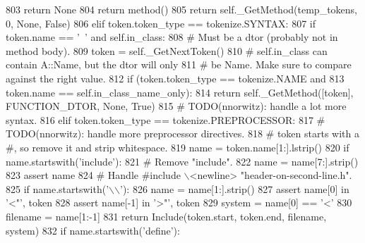 \begin{DoxyCode}
803                     \textcolor{keywordflow}{return} \textcolor{keywordtype}{None}
804                 \textcolor{keywordflow}{return} method()
805             \textcolor{keywordflow}{return} self.\_GetMethod(temp\_tokens, 0, \textcolor{keywordtype}{None}, \textcolor{keyword}{False})
806         \textcolor{keywordflow}{elif} token.token\_type == tokenize.SYNTAX:
807             \textcolor{keywordflow}{if} token.name == \textcolor{stringliteral}{'~'} \textcolor{keywordflow}{and} self.in\_class:
808                 \textcolor{comment}{# Must be a dtor (probably not in method body).}
809                 token = self.\_GetNextToken()
810                 \textcolor{comment}{# self.in\_class can contain A::Name, but the dtor will only}
811                 \textcolor{comment}{# be Name.  Make sure to compare against the right value.}
812                 \textcolor{keywordflow}{if} (token.token\_type == tokenize.NAME \textcolor{keywordflow}{and}
813                     token.name == self.in\_class\_name\_only):
814                     \textcolor{keywordflow}{return} self.\_GetMethod([token], FUNCTION\_DTOR, \textcolor{keywordtype}{None}, \textcolor{keyword}{True})
815             \textcolor{comment}{# TODO(nnorwitz): handle a lot more syntax.}
816         \textcolor{keywordflow}{elif} token.token\_type == tokenize.PREPROCESSOR:
817             \textcolor{comment}{# TODO(nnorwitz): handle more preprocessor directives.}
818             \textcolor{comment}{# token starts with a #, so remove it and strip whitespace.}
819             name = token.name[1:].lstrip()
820             \textcolor{keywordflow}{if} name.startswith(\textcolor{stringliteral}{'include'}):
821                 \textcolor{comment}{# Remove "include".}
822                 name = name[7:].strip()
823                 \textcolor{keyword}{assert} name
824                 \textcolor{comment}{# Handle #include \(\backslash\)<newline> "header-on-second-line.h".}
825                 \textcolor{keywordflow}{if} name.startswith(\textcolor{stringliteral}{'\(\backslash\)\(\backslash\)'}):
826                     name = name[1:].strip()
827                 \textcolor{keyword}{assert} name[0] \textcolor{keywordflow}{in} \textcolor{stringliteral}{'<"'}, token
828                 \textcolor{keyword}{assert} name[-1] \textcolor{keywordflow}{in} \textcolor{stringliteral}{'>"'}, token
829                 system = name[0] == \textcolor{stringliteral}{'<'}
830                 filename = name[1:-1]
831                 \textcolor{keywordflow}{return} Include(token.start, token.end, filename, system)
832             \textcolor{keywordflow}{if} name.startswith(\textcolor{stringliteral}{'define'}):

\end{DoxyCode}
